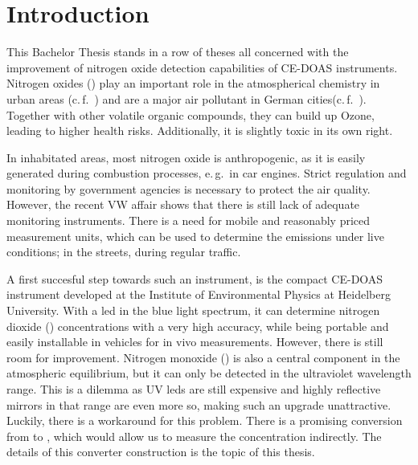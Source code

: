 \section{Introduction}
\label{sec:intro}

This Bachelor Thesis stands in a row of theses all concerned with the
improvement of nitrogen oxide detection capabilities of CE-DOAS
instruments. Nitrogen oxides () play an important role in the
atmospherical chemistry in urban areas (c.\,f.~\cite{roedel}) and are
a major air pollutant in German
cities(c.\,f.~\cite{no2schadstoff,who}). Together with other
volatile organic compounds, they can build up Ozone, leading to
higher health risks. Additionally, it is slightly toxic in its own
right.

In inhabitated areas, most nitrogen oxide is anthropogenic, as it is
easily generated during combustion processes, e.\,g.\ in car
engines. Strict regulation and monitoring by government agencies is
necessary to protect the air quality. However, the recent VW affair
shows that there is still lack of adequate monitoring
instruments. There is a need for mobile and reasonably priced measurement
units, which can be used to determine the  emissions under
live conditions; in the streets, during regular traffic.

A first succesful step towards such an instrument, is the compact
CE-DOAS instrument developed at the Institute of Environmental Physics
at Heidelberg University. With a led in the blue light spectrum, it
can determine nitrogen dioxide () concentrations with a very
high accuracy, while being portable and easily installable in vehicles
for in vivo measurements. However, there is still room for
improvement. Nitrogen monoxide () is also a central component
in the atmospheric  equilibrium, but it can only be detected
in the ultraviolet wavelength range. This is a dilemma as UV leds are
still expensive and highly reflective mirrors in that range are even
more so, making such an upgrade unattractive. Luckily, there is a
workaround for this problem. There is a promising conversion from
 to , which would allow us to measure the concentration
indirectly. The details of this converter construction is the topic of
this thesis.

